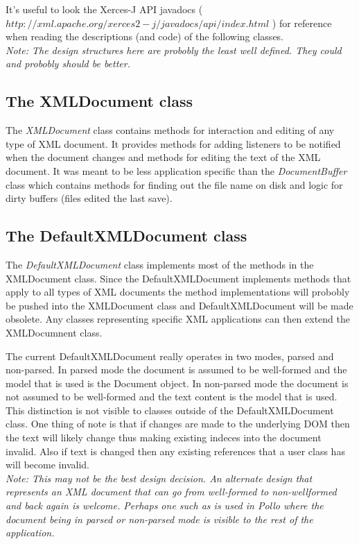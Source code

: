 \documentclass[12pt]{article}
\begin{document}
It's useful to look the Xerces-J API javadocs
( $http://xml.apache.org/xerces2-j/javadocs/api/index.html$ ) for reference when
reading the descriptions (and code) of the following classes.\\
\emph{Note: The design structures here are probobly the least well defined. They
could and probobly should be better.}

\subsection{The XMLDocument class}
The \emph{XMLDocument} class contains methods for interaction and editing of any
type of XML document. It provides methods for adding listeners to be notified
when the document changes and methods for editing the text of the XML document.
It was meant to be less application specific than the \emph{DocumentBuffer}
class which contains methods for finding out the file name on disk and logic for
dirty buffers (files edited the last save).

\subsection{The DefaultXMLDocument class}
The \emph{DefaultXMLDocument} class implements most of the methods in the
XMLDocument class. Since the DefaultXMLDocument implements methods that apply to
all types of XML documents the method implementations will probobly be pushed
into the XMLDocument class and DefaultXMLDocument will be made obsolete. Any
classes representing specific XML applications can then extend the XMLDocumnent
class.

The current DefaultXMLDocument really operates in two modes, parsed and
non-parsed. In parsed mode the document is assumed to be well-formed and the
model that is used is the Document object. In non-parsed mode the document is
not assumed to be well-formed and the text content is the model that is used.
This distinction is not visible to classes outside of the DefaultXMLDocument
class. One thing of note is that if changes are made to the underlying DOM then
the text will likely change thus making existing indeces into the document
invalid. Also if text is changed then any existing references that a user class
has will become invalid.\\
\emph{Note: This may not be the best design decision. An alternate design that
represents an XML document that can go from well-formed to non-wellformed and
back again is welcome. Perhaps one such as is used in Pollo where the document
being in parsed or non-parsed mode is visible to the rest of the application.}
\end{document}
